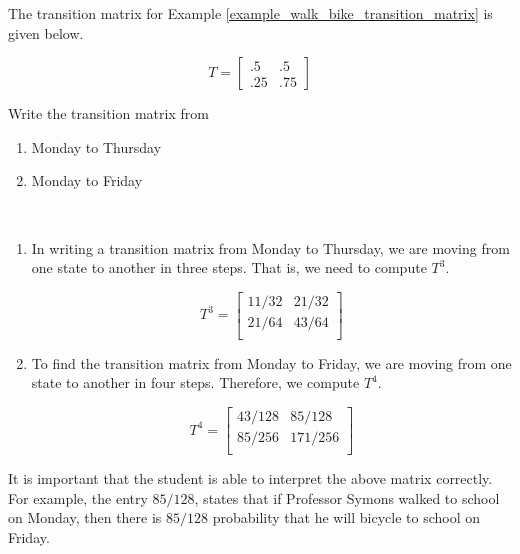\begin{example}\label{example_walk_bike_transition_matrix3_and_4}
    The transition matrix for Example \ref{example_walk_bike_transition_matrix} is given below.

    \[
        T = \begin{bmatrix}
            .5  & .5  \\
            .25 & .75
        \end{bmatrix}
    \]

    Write the transition matrix from
    \begin{enumerate}
        \item Monday to Thursday
        \item Monday to Friday
    \end{enumerate}
\end{example}

\begin{solution}~
    \begin{enumerate}
        \item In writing a transition matrix from Monday to Thursday, we are moving from one state to another in three steps. That is, we need to compute \(T^3\).

              \[
                  T^3 =
                  \begin{bmatrix}
                      11/32 & 21/32 \\
                      21/64 & 43/64 \\
                  \end{bmatrix}
              \]
        \item To find the transition matrix from Monday to Friday, we are moving from one state to another in four steps. Therefore, we compute \(T^4\).

              \[
                  T^4 =
                  \begin{bmatrix}
                      43/128 & 85/128  \\
                      85/256 & 171/256 \\
                  \end{bmatrix}
              \]
    \end{enumerate}

    It is important that the student is able to interpret the above matrix correctly. For example, the entry $85/128$, states that if Professor Symons walked to school on Monday, then there is $85/128$ probability that he will bicycle to school on Friday.
\end{solution}

